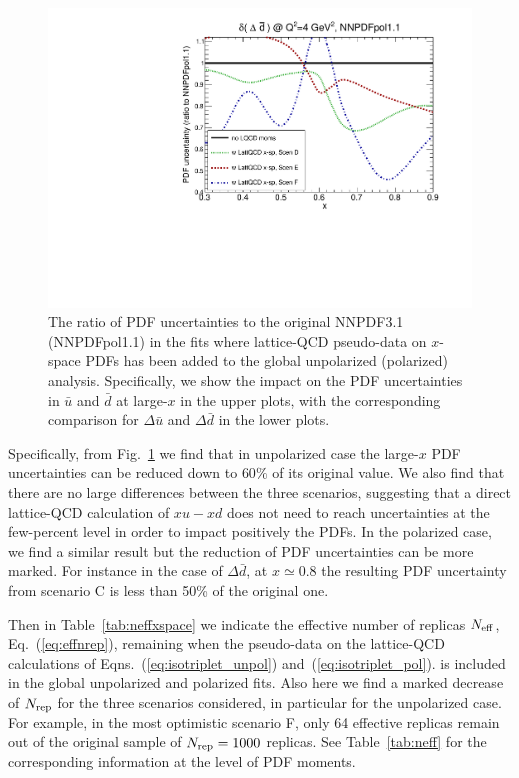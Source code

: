 \begin{figure}[!t]
\includegraphics[scale=0.45]{plots/xdbar-pol-lattice-relerr-xdata-xspace.pdf}
\caption{\small The ratio of PDF uncertainties to the original
  NNPDF3.1 (NNPDFpol1.1) in the fits where lattice-QCD pseudo-data
  on $x$-space PDFs has been added to the global unpolarized
  (polarized) analysis.
  Specifically, we show the impact on the PDF uncertainties
  in $\bar{u}$ and $\bar{d}$ at large-$x$ in the upper
  plots, with the corresponding comparison for $\Delta\bar{u}$
  and $\Delta\bar{d}$ in the lower plots.
}    
\label{fig:impactxspace}
\end{figure}

Specifically, from Fig.~\ref{fig:impactxspace} we find that
in unpolarized case the large-$x$ PDF uncertainties can be reduced
down to $60\%$ of its original value.
%
We also find that there are no large
differences between the three
scenarios, suggesting that a direct lattice-QCD calculation
of $x u-x d$ does not need to reach uncertainties
at the few-percent level in order to impact positively
the PDFs.
%
In the polarized case, we find a similar result but the reduction
of PDF uncertainties can be more marked.
%
For instance in the case of $\Delta \bar{d}$, at $x\simeq 0.8$
the resulting PDF uncertainty from scenario C is less than 50\%
of the original one.

Then in Table~\ref{tab:neffxspace} we indicate the effective number of replicas
$N_{\rm eff}$, Eq.~(\ref{eq:effnrep}), remaining when
the pseudo-data
    on the lattice-QCD calculations
    of Eqns.~(\ref{eq:isotriplet_unpol})
and~(\ref{eq:isotriplet_pol}).
   is included in the global
   unpolarized and polarized fits.
   Also here we find a marked decrease of $N_{\rm rep}$
   for the three scenarios considered,
   in particular for the unpolarized case.
   For example, in the most optimistic scenario F, only
   64 effective replicas remain out of the
   original sample of $N_{\rm rep}=1000$ replicas.
   See Table~\ref{tab:neff} for the corresponding
   information at the level of PDF moments.
   
